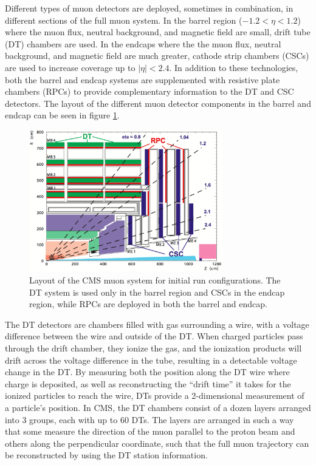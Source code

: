 Different types of muon detectors are deployed, sometimes in combination, in different sections of the full muon system. In the barrel region ($-1.2<\eta<1.2$) where the muon flux, neutral background, and magnetic field are small, drift tube (DT) chambers are used. In the endcaps where the the muon flux, neutral background, and magnetic field are much greater, cathode strip chambers (CSCs) are used to increase coverage up to $|\eta|<2.4$. In addition to these technologies, both the barrel and endcap systems are supplemented with resistive plate chambers (RPCs) to provide complementary information to the DT and CSC detectors. The layout of the different muon detector components in the barrel and endcap can be seen in figure \ref{fig:muonGeometry}.
 \begin{figure}
	\centering
	\includegraphics[width=0.75\textwidth]{detector/figs/muonGeometry}
	\renewcommand{\baselinestretch}{1.0}
	\caption[Layout of the CMS muon system for initial run configurations.]{Layout of the CMS muon system for initial run configurations. The DT system is used only in the barrel region and CSCs in the endcap region, while RPCs are deployed in both the barrel and endcap.}
	\label{fig:muonGeometry}
\end{figure}

The DT detectors are chambers filled with gas surrounding a wire, with a voltage difference between the wire and outside of the DT. When charged particles pass through the drift chamber, they ionize the gas, and the ionization products will drift across the voltage difference in the tube, resulting in a detectable voltage change in the DT. By measuring both the position along the DT wire where charge is deposited, as well as reconstructing the ``drift time'' it takes for the ionized particles to reach the wire, DTs provide a 2-dimensional measurement of a particle's position. In CMS, the DT chambers consist of a dozen layers arranged into 3 groups, each with up to 60 DTs. The layers are arranged in such a way that some measure the direction of the muon parallel to the proton beam and others along the perpendicular coordinate, such that the full muon trajectory can be reconstructed by using the DT station information.

